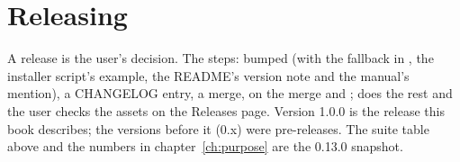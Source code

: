 \section{Releasing}
A release is the user's decision. The steps:  bumped (with the fallback in , the
installer script's example, the README's version note and the manual's mention), a CHANGELOG entry, a merge,
 on the merge and ;  does the rest and the user
checks the assets on the Releases page. Version 1.0.0 is the release this book describes; the versions before it
(0.x) were pre-releases. The suite table above and the numbers in chapter~\ref{ch:purpose} are the 0.13.0 snapshot.
